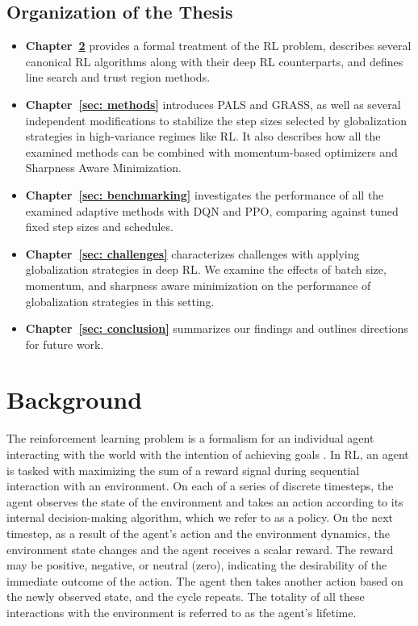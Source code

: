 \section{Organization of the Thesis}
\begin{itemize}
\item \textbf{Chapter~\ref{sec: background}} provides a formal treatment of the RL problem, describes several canonical RL algorithms along with their deep RL counterparts, and defines line search and trust region methods.
\item \textbf{Chapter~\ref{sec: methods}} introduces PALS and GRASS, as well as several independent modifications to stabilize the step sizes selected by globalization strategies in high-variance regimes like RL. It also describes how all the examined methods can be combined with momentum-based optimizers and Sharpness Aware Minimization.
\item \textbf{Chapter~\ref{sec: benchmarking}} investigates the performance of all the examined adaptive methods with DQN and PPO, comparing against tuned fixed step sizes and schedules.
\item \textbf{Chapter~\ref{sec: challenges}} characterizes challenges with applying globalization strategies in deep RL. We examine the effects of batch size, momentum, and sharpness aware minimization on the performance of globalization strategies in this setting. 
\item \textbf{Chapter~\ref{sec: conclusion}} summarizes our findings and outlines directions for future work.
\end{itemize}

\chapter{Background} \label{sec: background}
The reinforcement learning problem is a formalism for an individual agent interacting with the world with the intention of achieving goals \cite{sutton1998introduction}. In RL, an agent is tasked with maximizing the sum of a reward signal during sequential interaction with an environment. On each of a series of discrete timesteps, the agent observes the state of the environment and takes an action according to its internal decision-making algorithm, which we refer to as a policy. On the next timestep, as a result of the agent's action and the environment dynamics, the environment state changes and the agent receives a scalar reward. The reward may be positive, negative, or neutral (zero), indicating the desirability of the immediate outcome of the action. The agent then takes another action based on the newly observed state, and the cycle repeats. The totality of all these interactions with the environment is referred to as the agent's lifetime. 

